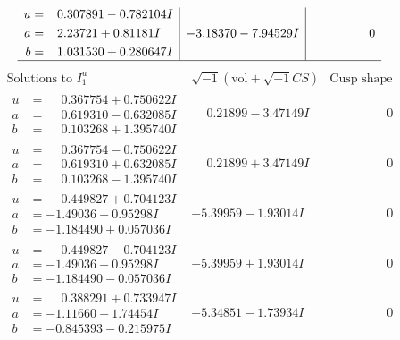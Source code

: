 \documentclass[1p]{elsarticle_modified}
\theoremstyle{definition}
\newcommand{\I}{\sqrt{-1}}
\begin{document}
$$\begin{array}{c|c|c}
\begin{aligned}
u &= \phantom{-}0.307891 - 0.782104 I \\
a &= \phantom{-}2.23721 + 0.81181 I \\
b &= \phantom{-}1.031530 + 0.280647 I\end{aligned}
 & -3.18370 - 7.94529 I & \phantom{-0.000000 } 0\\
 \hline 
 \end{array}$$\newpage$$\begin{array}{c|c|c}  
\text{Solutions to }I^u_{1}& \I (\text{vol} + \sqrt{-1}CS) & \text{Cusp shape}\\
 \hline 
\begin{aligned}
u &= \phantom{-}0.367754 + 0.750622 I \\
a &= \phantom{-}0.619310 - 0.632085 I \\
b &= \phantom{-}0.103268 + 1.395740 I\end{aligned}
 & \phantom{-}0.21899 - 3.47149 I & \phantom{-0.000000 } 0 \\ \hline\begin{aligned}
u &= \phantom{-}0.367754 - 0.750622 I \\
a &= \phantom{-}0.619310 + 0.632085 I \\
b &= \phantom{-}0.103268 - 1.395740 I\end{aligned}
 & \phantom{-}0.21899 + 3.47149 I & \phantom{-0.000000 } 0 \\ \hline\begin{aligned}
u &= \phantom{-}0.449827 + 0.704123 I \\
a &= -1.49036 + 0.95298 I \\
b &= -1.184490 + 0.057036 I\end{aligned}
 & -5.39959 - 1.93014 I & \phantom{-0.000000 } 0 \\ \hline\begin{aligned}
u &= \phantom{-}0.449827 - 0.704123 I \\
a &= -1.49036 - 0.95298 I \\
b &= -1.184490 - 0.057036 I\end{aligned}
 & -5.39959 + 1.93014 I & \phantom{-0.000000 } 0 \\ \hline\begin{aligned}
u &= \phantom{-}0.388291 + 0.733947 I \\
a &= -1.11660 + 1.74454 I \\
b &= -0.845393 - 0.215975 I\end{aligned}
 & -5.34851 - 1.73934 I & \phantom{-0.000000 } 0 \\ \hline\begin{aligned}

\end{aligned}
\end{array}$$
\end{document}
